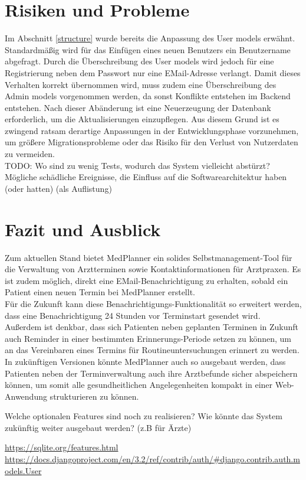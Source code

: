 \documentclass[conference]{IEEEtran}
\begin{document}

\section{Risiken und Probleme}
Im Abschnitt \ref{structure} wurde bereits die Anpassung des User models erwähnt. Standardmäßig wird für das Einfügen eines neuen Benutzers ein Benutzername abgefragt. Durch die Überschreibung des User models wird jedoch für eine Registrierung neben dem Passwort nur eine EMail-Adresse verlangt. Damit dieses Verhalten korrekt übernommen wird, muss zudem eine Überschreibung des Admin models vorgenommen werden, da sonst Konflikte entstehen im Backend entstehen. Nach dieser Abänderung ist eine Neuerzeugung der Datenbank erforderlich, um die Aktualisierungen einzupflegen. Aus diesem Grund ist es zwingend ratsam derartige Anpassungen in der Entwicklungsphase vorzunehmen, um größere Migrationsprobleme oder das Risiko für den Verlust von Nutzerdaten zu vermeiden.\\
TODO: Wo sind zu wenig Tests, wodurch das System vielleicht abstürzt?
Mögliche schädliche Ereignisse, die Einfluss auf die Softwarearchitektur haben (oder hatten) (als Auflistung)

\section{Fazit und Ausblick}
Zum aktuellen Stand bietet MedPlanner ein solides Selbstmanagement-Tool für die Verwaltung von Arztterminen sowie Kontaktinformationen für Arztpraxen. Es ist zudem möglich, direkt eine EMail-Benachrichtigung zu erhalten, sobald ein Patient einen neuen Termin bei MedPlanner erstellt.\\
Für die Zukunft kann diese Benachrichtigungs-Funktionalität so erweitert werden, dass eine Benachrichtigung 24 Stunden vor Terminstart gesendet wird.\\
Außerdem ist denkbar, dass sich Patienten neben geplanten Terminen in Zukunft auch Reminder in einer bestimmten Erinnerungs-Periode setzen zu können, um an das Vereinbaren eines Termins für Routineuntersuchungen erinnert zu werden.\\
In zukünftigen Versionen könnte MedPlanner auch so ausgebaut werden, dass Patienten neben der Terminverwaltung auch ihre Arztbefunde sicher abspeichern können, um somit alle gesundheitlichen Angelegenheiten kompakt in einer Web-Anwendung strukturieren zu können.


Welche optionalen Features sind noch zu realisieren? Wie könnte das System zukünftig weiter ausgebaut werden? (z.B für Ärzte)




\begin{thebibliography}{00}
 \url{https://sqlite.org/features.html}
 \url{https://docs.djangoproject.com/en/3.2/ref/contrib/auth/#django.contrib.auth.models.User}
\end{thebibliography}
\end{document}
